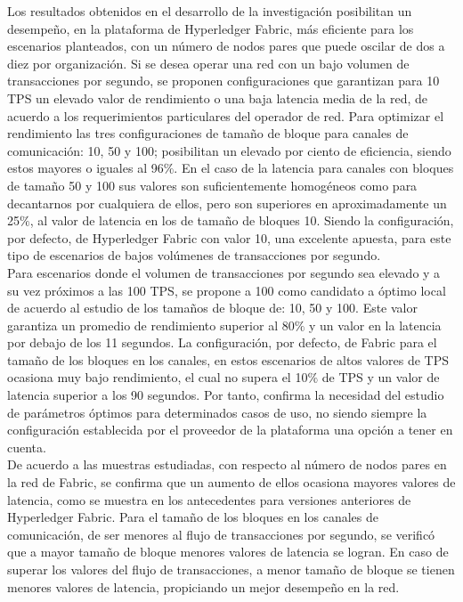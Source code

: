 \begin{conclusions}
Los resultados obtenidos en el desarrollo de la investigaci\'on posibilitan un desempe\~no, en la plataforma de Hyperledger Fabric, m\'as eficiente para los escenarios planteados, con un n\'umero de nodos pares que puede oscilar de dos a diez por organizaci\'on. Si se desea operar una red con un bajo volumen de transacciones por segundo, se proponen configuraciones que garantizan para 10 TPS un elevado valor de rendimiento o una baja latencia media de la red, de acuerdo a los requerimientos particulares del operador de red. Para optimizar el rendimiento las tres configuraciones de tama\~no de bloque para canales de comunicaci\'on: 10, 50 y 100; posibilitan un elevado por ciento de eficiencia, siendo estos mayores o iguales al 96$\%$. En el caso de la latencia para canales con bloques de tama\~no 50 y 100 sus valores son suficientemente homog\'eneos como para decantarnos por cualquiera de ellos, pero son superiores en aproximadamente un 25$\%$, al valor de latencia en los de tama\~no de bloques 10. Siendo la configuraci\'on, por defecto, de Hyperledger Fabric con valor 10, una excelente apuesta, para este tipo de escenarios de bajos vol\'umenes de transacciones por segundo.\\

Para escenarios donde el volumen de transacciones por segundo sea elevado y a su vez pr\'oximos a las 100 TPS, se propone a 100 como candidato a \'optimo local de acuerdo al estudio de los tama\~nos de bloque de: 10, 50 y 100. Este valor garantiza un promedio de rendimiento superior al 80$\%$ y un valor en la latencia por debajo de los 11 segundos. La configuraci\'on, por defecto, de Fabric para el tama\~no de los bloques en los canales, en estos escenarios de altos valores de TPS ocasiona muy bajo rendimiento, el cual no supera el 10$\%$ de TPS y un valor de latencia superior a los 90 segundos. Por tanto, confirma la necesidad del estudio de par\'ametros \'optimos para determinados casos de uso, no siendo siempre la configuraci\'on establecida por el proveedor de la plataforma una opci\'on a tener en cuenta.\\ 

De acuerdo a las muestras estudiadas, con respecto al n\'umero de nodos pares en la red de Fabric, se confirma que un aumento de ellos ocasiona mayores valores de latencia, como se muestra en los antecedentes para versiones anteriores de Hyperledger Fabric. Para el tama\~no de los bloques en los canales de comunicaci\'on, de ser menores al flujo de transacciones por segundo, se verific\'o que a mayor tama\~no de bloque menores valores de latencia se logran. En caso de superar los valores del flujo de transacciones, a menor tama\~no de bloque se tienen menores valores de latencia, propiciando un mejor desempe\~no en la red.  
\end{conclusions}
